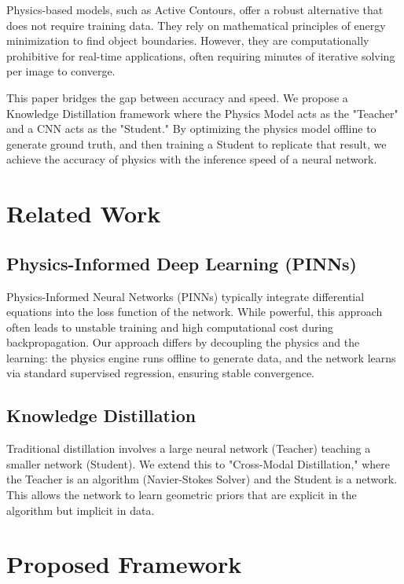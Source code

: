 \documentclass[journal]{IEEEtran}
\begin{document}
Physics-based models, such as Active Contours, offer a robust alternative that does not require training data. They rely on mathematical principles of energy minimization to find object boundaries. However, they are computationally prohibitive for real-time applications, often requiring minutes of iterative solving per image to converge.

This paper bridges the gap between accuracy and speed. We propose a Knowledge Distillation framework where the Physics Model acts as the "Teacher" and a CNN acts as the "Student." By optimizing the physics model offline to generate ground truth, and then training a Student to replicate that result, we achieve the accuracy of physics with the inference speed of a neural network.

\section{Related Work}
\subsection{Physics-Informed Deep Learning (PINNs)}
Physics-Informed Neural Networks (PINNs) typically integrate differential equations into the loss function of the network. While powerful, this approach often leads to unstable training and high computational cost during backpropagation. Our approach differs by decoupling the physics and the learning: the physics engine runs offline to generate data, and the network learns via standard supervised regression, ensuring stable convergence.

\subsection{Knowledge Distillation}
Traditional distillation involves a large neural network (Teacher) teaching a smaller network (Student). We extend this to "Cross-Modal Distillation," where the Teacher is an algorithm (Navier-Stokes Solver) and the Student is a network. This allows the network to learn geometric priors that are explicit in the algorithm but implicit in data.

\section{Proposed Framework}
\end{document}
